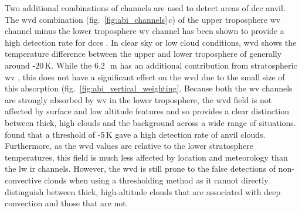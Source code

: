 Two additional combinations of channels are used to detect areas of \acrshort{dcc} anvil. 
The \acrfull{wvd} combination (fig.~\ref{fig:abi_channels}\,c) of the upper troposphere \acrshort{wv} channel minus the lower troposphere \acrshort{wv} channel has been shown to provide a high detection rate for \acrshort{dcc}s \citep{muller_role_2018, muller_novel_2019}.
In clear sky or low cloud conditions, \acrshort{wvd} shows the temperature difference between the upper and lower troposphere of generally around -20\,\unit{K}. 
While the 6.2\,\unit{\mu m} has an additional contribution from stratospheric \acrshort{wv} \citep{schmetz_monitoring_1997}, this does not have a significant effect on the \acrshort{wvd} due to the small size of this absorption (fig.~\ref{fig:abi_vertical_weighting}.
Because both the \acrshort{wv} channels are strongly absorbed by \acrshort{wv} in the lower troposphere, the \acrshort{wvd} field is not affected by surface and low altitude features and so provides a clear distinction between thick, high clouds and the background across a wide range of situations.
\citet{muller_novel_2019} found that a threshold of -5\,\unit{K} gave a high detection rate of anvil clouds.
Furthermore, as the \acrshort{wvd} values are relative to the lower stratosphere temperatures, this field is much less affected by location and meteorology than the \acrshort{lw} \acrshort{ir} channels.
However, the \acrshort{wvd} is still prone to the false detections of non-convective clouds when using a thresholding method as it cannot directly distinguish between thick, high-altitude clouds that are associated with deep convection and those that are not.

